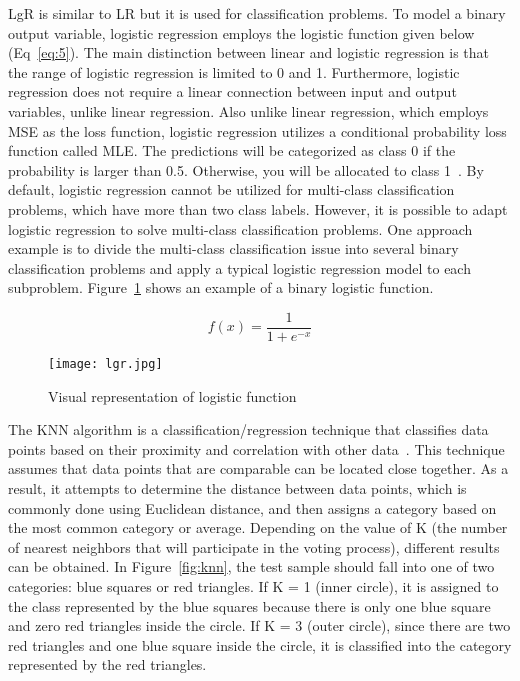 \gls{LgR} is similar to \gls{LR} but it is used for classification problems. To model a binary output variable, logistic regression employs the logistic function given below (Eq~\ref{eq:5}). The main distinction between linear and logistic regression is that the range of logistic regression is limited to 0 and 1. Furthermore, logistic regression does not require a linear connection between input and output variables, unlike linear regression. Also unlike linear regression, which employs \gls{MSE} as the loss function, logistic regression utilizes a conditional probability loss function called \gls{MLE}. The predictions will be categorized as class 0 if the probability is larger than 0.5. Otherwise, you will be allocated to class 1~\cite{Belyadi2021SupervisedLearning}. By default, logistic regression cannot be utilized for multi-class classification problems, which have more than two class labels. However, it is possible to adapt logistic regression to solve  multi-class classification problems. One approach example is to divide the multi-class classification issue into several binary classification problems and apply a typical logistic regression model to each subproblem. 
Figure~\ref{fig:lgr} shows an example of a binary logistic function. 

\begin{equation}\label{eq:5}
    f(x) = \frac{1}{1+e^{-x}}
\end{equation}

\begin{figure}[htbp]
    \centering
    \texttt{[image: lgr.jpg]}
    \caption{Visual representation of logistic function~\cite{Nasteski2017AnMethods}}
    \label{fig:lgr}
\end{figure}


The \gls{KNN} algorithm is a classification/regression technique that classifies data points based on their proximity and correlation with other data~\cite{2020WhatIBM}. This technique assumes that data points that are comparable can be located close together. As a result, it attempts to determine the distance between data points, which is commonly done using Euclidean distance, and then assigns a category based on the most common category or average. Depending on the value of K (the number of nearest neighbors that will participate in the voting process), different results can be obtained. In Figure~\ref{fig:knn}, the test sample should fall into one of two categories: blue squares or red triangles. If K = 1 (inner circle), it is assigned to the class represented by the blue squares because there is only one blue square and zero red triangles inside the circle. If K = 3 (outer circle), since there are two red triangles and one blue square inside the circle, it is classified into the category represented by the red triangles.


